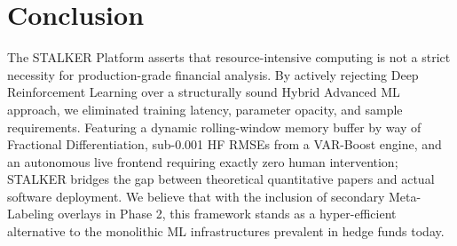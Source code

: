 \documentclass[journal,10pt,twocolumn]{IEEEtran}
\begin{document}
\section{Conclusion}

The STALKER Platform asserts that resource-intensive computing is not a strict necessity for production-grade financial analysis. By actively rejecting Deep Reinforcement Learning over a structurally sound Hybrid Advanced ML approach, we eliminated training latency, parameter opacity, and sample requirements. Featuring a dynamic rolling-window memory buffer by way of Fractional Differentiation, sub-0.001 HF RMSEs from a VAR-Boost engine, and an autonomous live frontend requiring exactly zero human intervention; STALKER bridges the gap between theoretical quantitative papers and actual software deployment. We believe that with the inclusion of secondary Meta-Labeling overlays in Phase 2, this framework stands as a hyper-efficient alternative to the monolithic ML infrastructures prevalent in hedge funds today.
\end{document}
